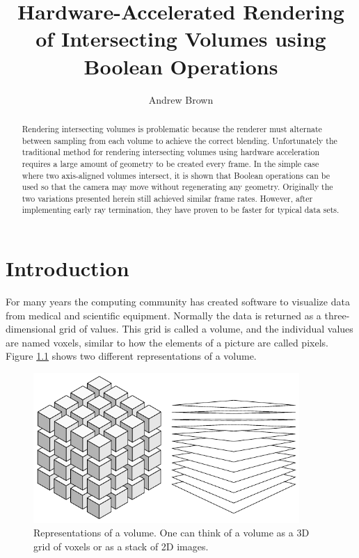 \documentclass{report}
\begin{document}
\title{Hardware-Accelerated Rendering of Intersecting Volumes using Boolean Operations}
\author{Andrew Brown}

\beforepreface
\afterpreface

\begin{abstract}
Rendering intersecting volumes is problematic because the renderer must
alternate between sampling from each volume to achieve the correct blending.
Unfortunately the traditional method for rendering intersecting volumes using
hardware acceleration requires a large amount of geometry to be created every
frame.  In the simple case where two axis-aligned volumes intersect, it is shown
that Boolean operations can be used so that the camera may move without
regenerating any geometry.  Originally the two variations presented herein
still achieved similar frame rates.  However, after implementing early ray
termination, they have proven to be faster for typical data sets.
\end{abstract}

\pagestyle{plain}

\chapter{Introduction}

For many years the computing community has created software to visualize data
from medical and scientific equipment.  Normally the data is returned as a
three-dimensional grid of values.  This grid is called a volume, and the
individual values are named voxels, similar to how the elements of a picture are
called pixels.  Figure \ref{representations} shows two different representations
of a volume.

\begin{figure}
\centering
\includegraphics[width=0.9\textwidth]{representations.pdf}
\caption{Representations of a volume.  One can think of a volume as a 3D grid of
voxels or as a stack of 2D images.}
\label{representations}
\end{figure}
\end{document}
